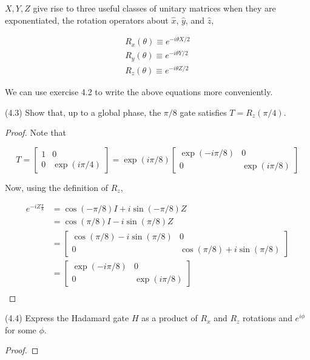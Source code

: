 \documentclass[main.tex]{subfiles}
\begin{document}
\begin{subappendices}
$X, Y, Z$ give rise to three useful classes of unitary matrices when they are exponentiated, the rotation operators about $\hat{x}$, $\hat{y}$, and $\hat{z}$,

\begin{align*}
R_x(\theta) \equiv e^{-i \theta X / 2} \\
R_y(\theta) \equiv e^{-i \theta Y / 2} \\
R_z(\theta) \equiv e^{-i \theta Z / 2} 
\end{align*}

We can use exercise 4.2 to write the above equations more conveniently.

\begin{exercise} (4.3) Show that, up to a global phase, the $\pi /8$ gate satisfies $T = R_z(\pi /4)$.

\begin{proof}

Note that 

$$
T = \begin{bmatrix}1 & 0 \\ 0 & \exp(i\pi / 4) \end{bmatrix} = \exp(i\pi / 8)\begin{bmatrix} \exp(-i \pi / 8)  & 0 \\ 0 & \exp(i \pi / 8)  \end{bmatrix} 
$$

Now, using the definition of $R_z$,

\begin{align*}
	e^{-i Z \frac{\pi}{8}} &= \cos(-\pi/8) I + i\sin (-\pi / 8)Z \\
	&=  \cos(\pi/8) I - i\sin (\pi / 8)Z \\
	&= \begin{bmatrix} \cos(\pi / 8) - i \sin (\pi / 8) & 0 \\ 0 & \cos(\pi/8) + i \sin (\pi / 8) \end{bmatrix} \\
	&= \begin{bmatrix} \exp(-i \pi / 8)  & 0 \\ 0 & \exp(i \pi / 8)  \end{bmatrix} \\
\end{align*}
\end{proof}
\end{exercise}

\begin{exercise} (4.4) Express the Hadamard gate $H$ as a product of $R_x$ and $R_z$ rotations and $e^{i \phi}$ for some $\phi $.
\begin{proof}


\end{proof}
\end{exercise}
\end{subappendices}
\end{document}
